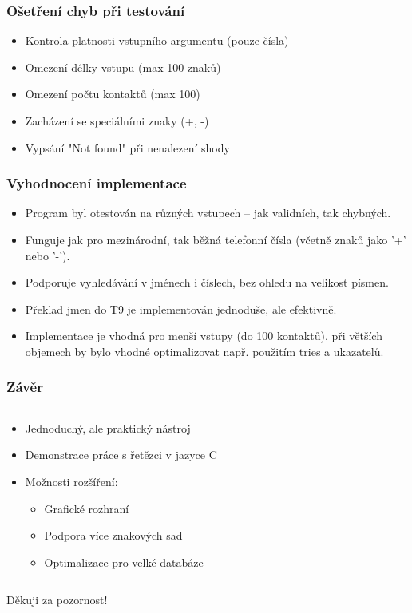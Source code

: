 \documentclass{beamer}
\begin{document}
\begin{frame}
\frametitle{Ošetření chyb při testování}
\begin{itemize}
\item Kontrola platnosti vstupního argumentu (pouze čísla)
\item Omezení délky vstupu (max 100 znaků)
\item Omezení počtu kontaktů (max 100)
\item Zacházení se speciálními znaky (+, -)
\item Vypsání "Not found" při nenalezení shody
\end{itemize}
\end{frame}
\begin{frame}
    \frametitle{Vyhodnocení implementace}
    \begin{itemize}
        \item Program byl otestován na různých vstupech – jak validních, tak chybných.
        \item Funguje jak pro mezinárodní, tak běžná telefonní čísla (včetně znaků jako '+' nebo '-').
        \item Podporuje vyhledávání v jménech i číslech, bez ohledu na velikost písmen.
        \item Překlad jmen do T9 je implementován jednoduše, ale efektivně.
        \item Implementace je vhodná pro menší vstupy (do 100 kontaktů), při větších objemech by bylo vhodné optimalizovat např. použitím tries a ukazatelů.
    \end{itemize}
\end{frame}
\begin{frame}
\frametitle{Závěr}
\begin{columns}
\begin{column}{0.7\textwidth}
\begin{itemize}
\item Jednoduchý, ale praktický nástroj
\item Demonstrace práce s řetězci v jazyce C
\item Možnosti rozšíření:
\begin{itemize}
\item Grafické rozhraní
\item Podpora více znakových sad
\item Optimalizace pro velké databáze
\end{itemize}
\end{itemize}
\end{column}
\begin{column}{0.3\textwidth}
\end{column}
\end{columns}

\vspace{0.5cm}
\centering
\Large{Děkuji za pozornost!}
\end{frame}
\end{document}
